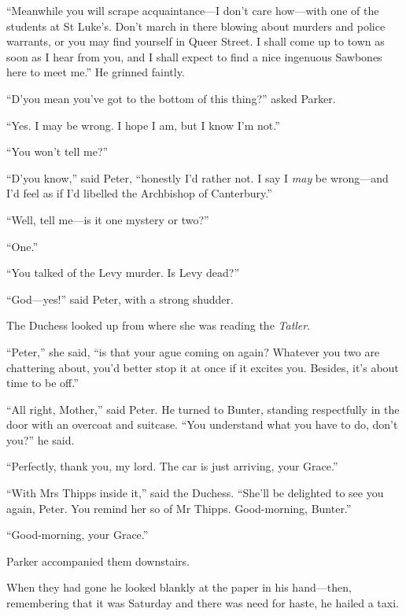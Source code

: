 \enquote{Meanwhile you will scrape acquaintance\allowbreak---\allowbreak I don’t care how\allowbreak---\allowbreak with one of the students at St Luke’s. Don’t march in there blowing about murders and police warrants, or you may find yourself in Queer Street. I shall come up to town as soon as I hear from you, and I shall expect to find a nice ingenuous Sawbones here to meet me.} He grinned faintly.

\enquote{D’you mean you’ve got to the bottom of this thing?} asked Parker.

\enquote{Yes. I may be wrong. I hope I am, but I know I’m not.}

\enquote{You won’t tell me?}

\enquote{D’you know,} said Peter, \enquote{honestly I’d rather not. I say I \textit{may} be wrong\allowbreak---\allowbreak and I’d feel as if I’d libelled the Archbishop of Canterbury.}

\enquote{Well, tell me\allowbreak---\allowbreak is it one mystery or two?}

\enquote{One.}

\enquote{You talked of the Levy murder. Is Levy dead?}

\enquote{God\allowbreak---\allowbreak yes!} said Peter, with a strong shudder.

The Duchess looked up from where she was reading the \textit{Tatler}.

\enquote{Peter,} she said, \enquote{is that your ague coming on again? Whatever you two are chattering about, you’d better stop it at once if it excites you. Besides, it’s about time to be off.}

\enquote{All right, Mother,} said Peter. He turned to Bunter, standing respectfully in the door with an overcoat and suitcase. \enquote{You understand what you have to do, don’t you?} he said.

\enquote{Perfectly, thank you, my lord. The car is just arriving, your Grace.}

\enquote{With Mrs Thipps inside it,} said the Duchess. \enquote{She’ll be delighted to see you again, Peter. You remind her so of Mr Thipps. Good-morning, Bunter.}

\enquote{Good-morning, your Grace.}

Parker accompanied them downstairs.

When they had gone he looked blankly at the paper in his hand\allowbreak---\allowbreak then, remembering that it was Saturday and there was need for haste, he hailed a taxi.

